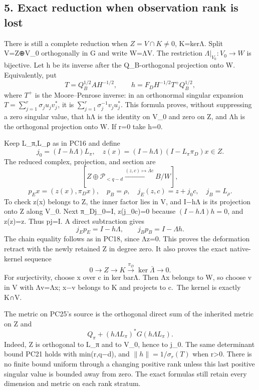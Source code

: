 \documentclass[11pt]{article}
\begin{document}
\subsection{5. Exact reduction when observation rank is lost}\label{exact-reduction-when-observation-rank-is-lost}

There is still a complete reduction when \(Z=V\cap K\ne0\), K=kerΛ. Split V=Z⊕V\_0 orthogonally in G and write W=ΛV. The restriction \(\Lambda|_{V_0}:V_0\to W\) is bijective. Let h be its inverse after the Q\_B-orthogonal projection onto W. Equivalently, put \[
T=Q_B^{1/2}AH^{-1/2},\qquad
h=F_DH^{-1/2}T^+Q_B^{1/2},
\tag{PC23}
\] where \(T^+\) is the Moore--Penrose inverse: in an orthonormal singular expansion \(T=\sum_{j=1}^r\sigma_j u_jv_j^*\), it is \(\sum_{j=1}^r\sigma_j^{-1}v_ju_j^*\). This formula proves, without suppressing a zero singular value, that hΛ is the identity on V\_0 and zero on Z, and Λh is the orthogonal projection onto W. If r=0 take h=0.

Keep L\_π,L\_ρ as in PC16 and define \[
j_0=(I-h\Lambda)L_\pi,\quad
z(x)=(I-h\Lambda)(I-L_\pi\pi_D)x\in Z.
\tag{PC24}
\] The reduced complex, projection, and section are \[
[Z\oplus\mathcal P_{<q-d}\xrightarrow{(z,c)\mapsto\bar\Lambda c} B/W],
\] \[
p_E x=(z(x),\pi_Dx),\quad p_B=\rho,
\quad j_E(z,c)=z+j_0c,\quad j_B=L_\rho.
\tag{PC25}
\] To check z(x) belongs to Z, the inner factor lies in V, and I−hΛ is its projection onto Z along V\_0. Next π\_Dj\_0=I, z(j\_0c)=0 because \((I-h\Lambda)h=0\), and z(z)=z. Thus pj=I. A direct subtraction gives \[
j_Ep_E=I-h\Lambda,\qquad j_Bp_B=I-\Lambda h.
\tag{PC26}
\] The chain equality follows as in PC18, since Λz=0. This proves the deformation retract with the newly retained Z in degree zero. It also proves the exact native-kernel sequence \[
0\to Z\to K\xrightarrow{\pi_D}\ker\bar\Lambda\to0.
\tag{PC27}
\] For surjectivity, choose x over c in ker barΛ. Then Λx belongs to W, so choose v in V with Λv=Λx; x−v belongs to K and projects to c.~The kernel is exactly K∩V.

The metric on PC25's source is the orthogonal direct sum of the inherited metric on Z and \[
Q_\pi+(h\Lambda L_\pi)^*G(h\Lambda L_\pi).
\tag{PC28}
\] Indeed, Z is orthogonal to L\_π and to V\_0, hence to j\_0. The same determinant bound PC21 holds with min(r,q−d), and \(\|h\|=1/\sigma_r(T)\) when r\textgreater0. There is no finite bound uniform through a changing positive rank unless this last positive singular value is bounded away from zero. The exact formulas still retain every dimension and metric on each rank stratum.
\end{document}
